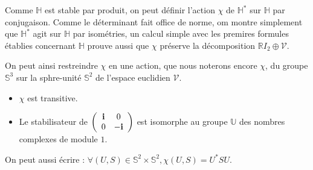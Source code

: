 Comme $\mathbb{H}$ est stable par produit, on peut d\'efinir l'action $\chi$ de $\mathbb{H}^{\ast}$ sur $\mathbb{H}$ par conjugaison. %
Comme le d\'eterminant fait office de norme, om montre simplement que $\mathbb{H}^{\ast}$ agit sur $\mathbb{H}$ par isom\'etries, %
un calcul simple avec les premires formules \'etablies concernant $\mathbb{H}$ prouve aussi que $\chi$ pr\'eserve la d\'ecomposition $\mathbb{R}I_2\oplus\mathcal{V}$.

\par
On peut ainsi restreindre $\chi$ en une action, que nous noterons encore $\chi$, du groupe $\mathbb{S}^3$ sur la sphre-unit\'e $\mathbb{S}^2$ de l'espace euclidien $\mathcal{V}$.

\begin{prop}
\begin{itemize}
\item $\chi$ est transitive.
\item Le stabilisateur de $\left(\begin{array}{cc}\mathbf{i}&0\\0&-\mathbf{i}\end{array}\right)$ est isomorphe au groupe $\mathbb{U}$ des nombres complexes de module $1$.
\end{itemize}
\end{prop}

\begin{rema}
On peut aussi \'ecrire : $\forall (U,S)\in\mathbb{S}^2\times\mathbb{S}^2 , \chi(U,S)=U^{\ast}SU$.
\end{rema}


